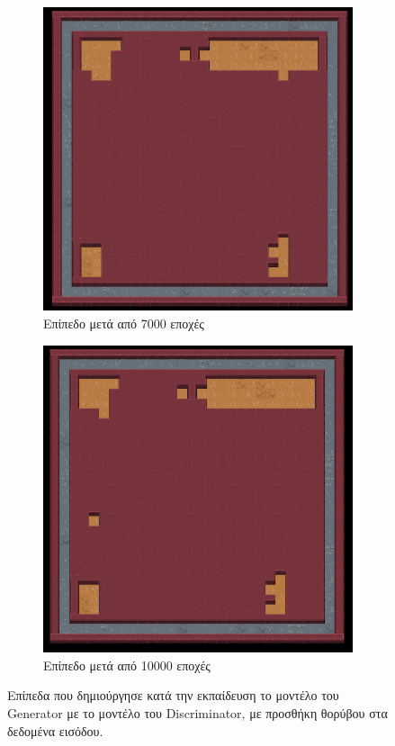 \begin{figure}[H]
\begin{subfigure}{.5\textwidth}
  \centering
  \includegraphics[width=.8\linewidth]{../images/result_images/dense-gan-with-fuzzy/combined_7000.png}
  \caption{Επίπεδο μετά από 7000 εποχές}
  \label{fig:sfig2}
\end{subfigure}
\begin{subfigure}{.5\textwidth}
  \centering
  \includegraphics[width=.8\linewidth]{../images/result_images/dense-gan-with-fuzzy/combined_10000.png}
  \caption{Επίπεδο μετά από 10000 εποχές}
  \label{fig:sfig2}
\end{subfigure}
\caption{Επίπεδα που δημιούργησε κατά την εκπαίδευση το μοντέλο του Generator με το μοντέλο του Discriminator, με προσθήκη θορύβου στα δεδομένα εισόδου.}
\label{fig:fig}
\end{figure}

